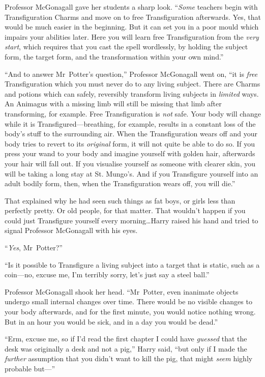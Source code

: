 Professor McGonagall gave her students a sharp look. “\emph{Some} teachers
begin with Transfiguration Charms and move on to free Transfiguration
afterwards. Yes, that would be much easier in the beginning. But it can set you
in a poor mould which impairs your abilities later. Here you will learn free
Transfiguration from the \emph{very start}, which requires that you cast the
spell wordlessly, by holding the subject form, the target form, and the
transformation within your own mind.”

“And to answer Mr~Potter’s question,” Professor McGonagall went on, “it is
\emph{free} Transfiguration which you must never do to any living subject.
There are Charms and potions which can safely, reversibly transform living
subjects in \emph{limited} ways. An Animagus with a missing limb will still be
missing that limb after transforming, for example. Free Transfiguration is
\emph{not} safe. Your body will change while it is Transfigured—breathing,
for example, results in a constant loss of the body’s stuff to the surrounding
air. When the Transfiguration wears off and your body tries to revert to its
\emph{original} form, it will not quite be able to do so. If you press your
wand to your body and imagine yourself with golden hair, afterwards your hair
will fall out. If you visualise yourself as someone with clearer skin, you will
be taking a long stay at St. Mungo’s. And if you Transfigure yourself into an
adult bodily form, then, when the Transfiguration wears off, you will die.”

That explained why he had seen such things as fat boys, or girls less than
perfectly pretty. Or old people, for that matter. That wouldn’t happen if you
could just Transfigure yourself every morning…Harry raised his hand and
tried to signal Professor McGonagall with his eyes.

“\emph{Yes}, Mr~Potter?”

“Is it possible to Transfigure a living subject into a target that is static,
such as a coin—no, excuse me, I’m terribly sorry, let’s just say a steel
ball.”

Professor McGonagall shook her head. “Mr~Potter, even inanimate objects
undergo small internal changes over time. There would be no visible changes to
your body afterwards, and for the first minute, you would notice nothing wrong.
But in an hour you would be sick, and in a day you would be dead.”

“Erm, excuse me, so if I’d read the first chapter I could have \emph{guessed}
that the desk was originally a desk and not a pig,” Harry said, “but only if I
made the \emph{further} assumption that you didn’t want to kill the pig, that
might \emph{seem} highly probable but—”


